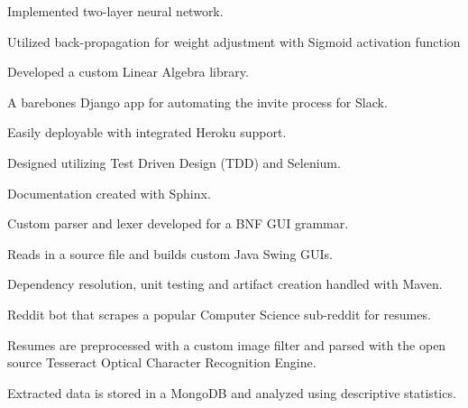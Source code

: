 \documentclass[]{sanchagrins-resume}
\begin{document}
\begin{minipage}[t]{0.63\textwidth}
\begin{tightemize}
\item Implemented two-layer neural network.
\item Utilized back-propagation for weight adjustment with Sigmoid activation function
\item Developed a custom Linear Algebra library.
\end{tightemize}
\sectionsep

\begin{tightemize}
\item A barebones Django app for automating the invite process for Slack.
\item Easily deployable with integrated Heroku support.
\item Designed utilizing Test Driven Design (TDD) and Selenium.
\item Documentation created with Sphinx.
\end{tightemize}
\sectionsep

\begin{tightemize}
\item Custom parser and lexer developed for a BNF GUI grammar.
\item Reads in a source file and builds custom Java Swing GUIs.
\item Dependency resolution, unit testing and artifact creation handled with Maven.
\end{tightemize}
\sectionsep


\begin{tightemize}
\item Reddit bot that scrapes a popular Computer Science sub-reddit for resumes.
\item Resumes are preprocessed with a custom image filter and parsed with the open source Tesseract Optical Character Recognition Engine.
\item Extracted data is stored in a MongoDB and analyzed using descriptive statistics.
\end{tightemize}
\sectionsep


\end{minipage} 
\end{document}
